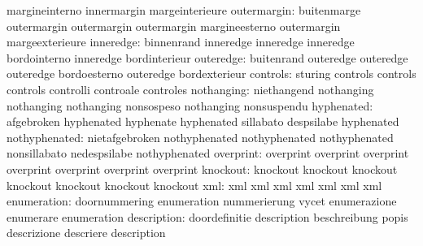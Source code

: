                            margineinterno            innermargin
                           margeinterieure
              outermargin: buitenmarge               outermargin
                           outermargin               outermargin
                           margineesterno            outermargin
                           margeexterieure
                inneredge: binnenrand                inneredge
                           inneredge                 inneredge
                           bordointerno              inneredge
                           bordinterieur
                outeredge: buitenrand                outeredge
                           outeredge                 outeredge
                           bordoesterno              outeredge
                           bordexterieur
                 controls: sturing                   controls
                           controls                  controls
                           controlli                 controale
                           controles
               nothanging: niethangend               nothanging
                           nothanging                nothanging
                           nonsospeso                nothanging
                           nonsuspendu
               hyphenated: afgebroken                hyphenated
                           hyphenate                 hyphenated
                           sillabato                 despsilabe
                           hyphenated
            nothyphenated: nietafgebroken            nothyphenated
                           nothyphenated             nothyphenated
                           nonsillabato              nedespsilabe
                           nothyphenated
                overprint: overprint                 overprint
                           overprint                 overprint
                           overprint                 overprint
                           overprint
                 knockout: knockout                  knockout
                           knockout                  knockout
                           knockout                  knockout
                           knockout
                      xml: xml                       xml
                           xml                       xml
                           xml                       xml
                           xml
              enumeration: doornummering             enumeration
                           nummerierung              vycet
                           enumerazione              enumerare
                           enumeration
              description: doordefinitie             description
                           beschreibung              popis
                           descrizione               descriere
                           description

